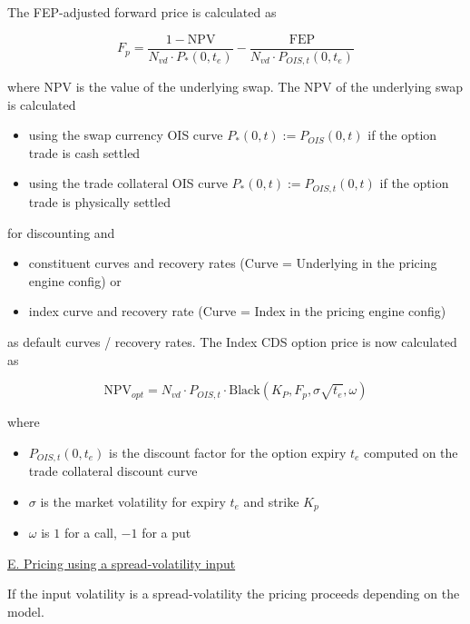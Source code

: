 The FEP-adjusted forward price is calculated as

\begin{equation}\label{pricing:cr_indexcdsoption_fep_adjusted_forward}
F_p = \frac{1 - \text{NPV}}{N_{vd} \cdot P_{*}(0,t_e)} - \frac{\text{FEP}}{N_{vd} \cdot P_{OIS,t}(0,t_e)}
\end{equation}

where NPV is the value of the underlying swap. The NPV of the underlying swap is calculated

\begin{itemize}
\item using the swap currency OIS curve $P_{*}(0,t) := P_{OIS}(0,t)$ if the option trade is cash settled
\item using the trade collateral OIS curve $P_{*}(0,t) := P_{OIS,t}(0,t)$ if the option trade is physically settled
\end{itemize}

for discounting and

\begin{itemize}
\item constituent curves and recovery rates (Curve = Underlying in the pricing engine config) or
\item index curve and recovery rate (Curve = Index in the pricing engine config)
\end{itemize}

as default curves / recovery rates. The Index CDS option price is now calculated as

\begin{equation}
\text{NPV}_{opt} = N_{vd} \cdot P_{OIS,t} \cdot \text{Black} \left( K_P, F_p, \sigma\sqrt{t_e}, \omega \right)
\end{equation}

where

\begin{itemize}
\item $P_{OIS,t}(0, t_e)$ is the discount factor for the option expiry $t_e$ computed on the trade collateral discount
  curve
\item $\sigma$ is the market volatility for expiry $t_e$ and strike $K_p$
\item $\omega$ is $1$ for a call, $-1$ for a put
\end{itemize}

\underline{E. Pricing using a spread-volatility input}

If the input volatility is a spread-volatility the pricing proceeds depending on the model.

